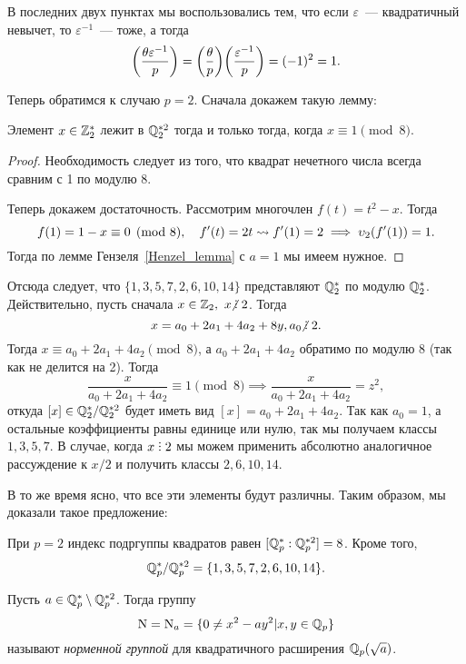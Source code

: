 	В последних двух пунктах мы воспользовались тем, что если $\varepsilon$~--- квадратичный невычет, то $\varepsilon^{-1}$~--- тоже, а тогда 
	\[
		\lr*{\frac{\theta \varepsilon^{-1}}{p}} = \lr*{\frac{\theta}{p}}\lr*{\frac{\varepsilon^{-1}}{p}} = (-1)^2 = 1.
	\]

	Теперь обратимся к случаю $p = 2$. Сначала докажем такую лемму:

	\begin{lemma} 
		Элемент $x \in \mathbb{Z}_{2}^{*}$ лежит в $\mathbb{Q}_{2}^{*2}$ тогда и только тогда, когда $x \equiv 1 \pmod{8}$.
	\end{lemma}
	\begin{proof}
		Необходимость следует из того, что квадрат нечетного числа всегда сравним с 1 по модулю 8. 

		Теперь докажем достаточность. Рассмотрим многочлен $f(t) = t^2 - x$. Тогда 
		\[
			f(1) = 1 - x \equiv 0 \pmod{8}, \quad f'(t) = 2t \rightsquigarrow f'(1) = 2  \implies \upsilon_{2}(f'(1)) = 1.
		\]
		Тогда по лемме Гензеля~\ref{Henzel_lemma} с $a = 1$ мы имеем нужное. 
	\end{proof}

	Отсюда следует, что $\{ 1, 3, 5, 7, 2, 6, 10, 14 \}$ представляют $\mathbb{Q}_{2}^{*}$ по модулю $\mathbb{Q}_{2}^{*}$. Действительно, пусть сначала $x \in \Z_{2}, \ x \notdivby 2$. Тогда 
	\[
		   x = a_0 + 2 a_1 + 4 a_2 + 8y, a_0 \notdivby 2 .
	\]
	Тогда $x \equiv a_0 + 2 a_1 + 4 a_2 \pmod{8}$, а $a_0 + 2 a_1 + 4 a_2$ обратимо по модулю 8 (так как не делится на 2). Тогда 
	\[
		\frac{x}{a_0 + 2 a_1 + 4 a_2} \equiv 1 \pmod{8} \implies \frac{x}{a_0 + 2 a_1 + 4 a_2} = z^2,
	\]
	откуда $[x] \in \mathbb{Q}_{2}^{*}/\mathbb{Q}_{2}^{*2}$ будет иметь вид $[x] = a_0 + 2 a_1 + 4 a_2$. Так как $a_0 = 1$, а остальные коэффициенты равны единице или нулю, так мы получаем классы $1, 3, 5, 7$. В случае, когда $x \divby 2$ мы можем применить абсолютно аналогичное рассуждение к $x / 2$ и получить классы $2, 6, 10, 14$. 

	В то же время ясно, что все эти элементы будут различны. Таким образом, мы доказали такое предложение: 

	\begin{statement}\label{squares_of_Q_2} 
	 	При $p = 2$ индекс подргуппы квадратов равен $[\mathbb{Q}_{p}^{*} : \mathbb{Q}_{p}^{*2}] = 8$. Кроме того, 
	 	\[
	 		\mathbb{Q}_{p}^{*}/\mathbb{Q}_{p}^{*2} = \{ 1, 3, 5, 7, 2, 6, 10, 14 \}.
	 	\]
	 \end{statement} 


	\begin{definition} 
		Пусть $a \in \mathbb{Q}_{p}^{*} \setminus \mathbb{Q}_{p}^{*2}$. Тогда группу 
		\[
			\operatorname{\mathrm{N}} = \operatorname{\mathrm{N}}_{a} = \{ 0 \neq x^2 - ay^2 \vert x, y \in \mathbb{Q}_{p}  \}		
		\]	
		называют \emph{норменной группой} для квадратичного расширения $\mathbb{Q}_{p}(\sqrt{a})$. 
	\end{definition}

